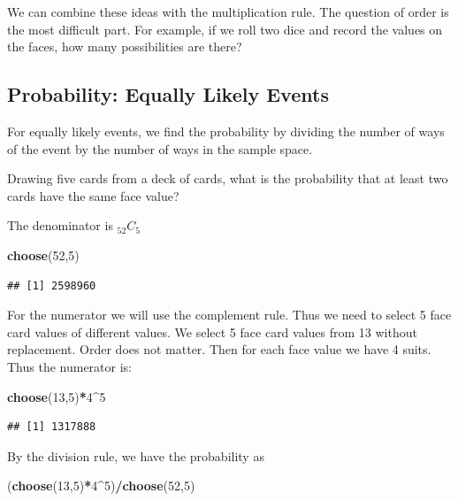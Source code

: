\documentclass[]{book}
\newenvironment{Shaded}{\begin{snugshade}}{\end{snugshade}}
\newcommand{\KeywordTok}[1]{\textcolor[rgb]{0.13,0.29,0.53}{\textbf{#1}}}
\newcommand{\DecValTok}[1]{\textcolor[rgb]{0.00,0.00,0.81}{#1}}
\newcommand{\OperatorTok}[1]{\textcolor[rgb]{0.81,0.36,0.00}{\textbf{#1}}}
\newcommand{\NormalTok}[1]{#1}
\theoremstyle{definition}
\theoremstyle{definition}
\theoremstyle{definition}
\theoremstyle{remark}
\begin{document}
We can combine these ideas with the multiplication rule. The question of
order is the most difficult part. For example, if we roll two dice and
record the values on the faces, how many possibilities are there?

\subsection{Probability: Equally Likely
Events}\label{probability-equally-likely-events}

For equally likely events, we find the probability by dividing the
number of ways of the event by the number of ways in the sample space.

Drawing five cards from a deck of cards, what is the probability that at
least two cards have the same face value?

The denominator is \(_{52}C_{5}\)

\begin{Shaded}
\begin{Highlighting}[]
\KeywordTok{choose}\NormalTok{(}\DecValTok{52}\NormalTok{,}\DecValTok{5}\NormalTok{)}
\end{Highlighting}
\end{Shaded}

\begin{verbatim}
## [1] 2598960
\end{verbatim}

For the numerator we will use the complement rule. Thus we need to
select 5 face card values of different values. We select 5 face card
values from 13 without replacement. Order does not matter. Then for each
face value we have 4 suits. Thus the numerator is:

\begin{Shaded}
\begin{Highlighting}[]
\KeywordTok{choose}\NormalTok{(}\DecValTok{13}\NormalTok{,}\DecValTok{5}\NormalTok{)}\OperatorTok{*}\DecValTok{4}\OperatorTok{^}\DecValTok{5}
\end{Highlighting}
\end{Shaded}

\begin{verbatim}
## [1] 1317888
\end{verbatim}

By the division rule, we have the probability as

\begin{Shaded}
\begin{Highlighting}[]
\NormalTok{(}\KeywordTok{choose}\NormalTok{(}\DecValTok{13}\NormalTok{,}\DecValTok{5}\NormalTok{)}\OperatorTok{*}\DecValTok{4}\OperatorTok{^}\DecValTok{5}\NormalTok{)}\OperatorTok{/}\KeywordTok{choose}\NormalTok{(}\DecValTok{52}\NormalTok{,}\DecValTok{5}\NormalTok{)}
\end{Highlighting}
\end{Shaded}
\end{document}
